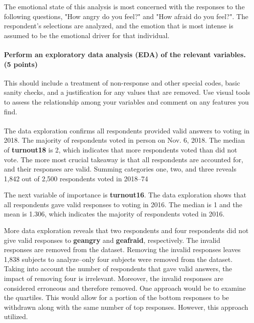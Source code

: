 \documentclass[12pt]{article}
\begin{document}
The emotional state of this analysis is most concerned with the responses to the following questions, "How angry do you feel?" and "How afraid do you feel?".  The respondent's selections are analyzed, and the emotion that is most intense is assumed to be the emotional driver for that individual.

\paragraph{Perform an exploratory data analysis (EDA) of the relevant variables. (5 points)}
This should include a treatment of non-response and other special codes, basic sanity checks, and a justification for any values that are removed. Use visual tools to assess the relationship among your variables and comment on any features you find.

\paragraph{}
The data exploration confirms all respondents provided valid answers to voting in 2018.  The majority of respondents voted in person on Nov. 6, 2018.  The median of \textbf{turnout18} is 2, which indicates that more respondents voted than did not vote.  The more most crucial takeaway is that all respondents are accounted for, and their responses are valid.  Summing categories one, two, and three reveals 1,842 out of 2,500 respondents voted in 2018--74%

The next variable of importance is \textbf{turnout16}.  The data exploration shows that all respondents gave valid responses to voting in 2016.  The median is 1 and the mean is 1.306, which indicates the majority of respondents voted in 2016.  

More data exploration reveals that two respondents and four respondents did not give valid responses to \textbf{geangry} and \textbf{geafraid}, respectively. The invalid responses are removed from the dataset.  Removing the invalid responses leaves 1,838 subjects to analyze--only four subjects were removed from the dataset.  Taking into account the number of respondents that gave valid answers, the impact of removing four is irrelevant.  Moreover, the invalid responses are considered erroneous and therefore removed.  One approach would be to examine the quartiles.  This would allow for a portion of the bottom responses to be withdrawn along with the same number of top responses.  However, this approach utilized.  
\end{document}
